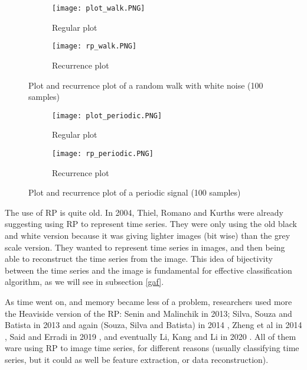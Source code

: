 \documentclass[11pt]{article}
\begin{document}
\begin{onehalfspace}
\begin{figure}[h!]
    \centering
    \captionsetup{justification=centering}
    \begin{subfigure}{0.4\textwidth}
        \texttt{[image: plot\_walk.PNG]}
        \caption{Regular plot}
    \end{subfigure}
    \begin{subfigure}{0.4\textwidth}
        \texttt{[image: rp\_walk.PNG]}
        \caption{Recurrence plot}
    \end{subfigure}
    \caption{Plot and recurrence plot of a random walk with white noise 
    \label{fig:random_walk}(100 samples)}
\end{figure}

\begin{figure}[h!]
    \centering
    \captionsetup{justification=centering}
    \begin{subfigure}{0.4\textwidth}
        \texttt{[image: plot\_periodic.PNG]}
        \caption{Regular plot}
    \end{subfigure}
    \begin{subfigure}{0.4\textwidth}
        \texttt{[image: rp\_periodic.PNG]}
        \caption{Recurrence plot}
    \end{subfigure}
    \caption{Plot and recurrence plot of a periodic signal (100 samples)}
    \label{fig:periodic}
\end{figure}


The use of RP is quite old. In 2004, Thiel, Romano and Kurths \cite{thiel} were already suggesting using RP to represent time series. They were only using the old black and white version because it was giving lighter images (bit wise) than the grey scale version. They wanted to represent time series in images, and then being able to reconstruct the time series from the image. This idea of bijectivity between the time series and the image is fundamental for effective classification algorithm, as we will see in subsection \ref{gaf}. 

As time went on, and memory became less of a problem, researchers used more the Heaviside version of the RP: Senin and Malinchik in 2013; Silva, Souza and Batista in 2013 \cite{silva} and again (Souza, Silva and Batista) in 2014 \cite{souza}, Zheng et al in 2014 \cite{zheng}, Said and Erradi in 2019 \cite{senin}, and eventually Li, Kang and Li in 2020 \cite{li}. All of them ware using RP to image time series, for different reasons (usually classifying time series, but it could as well be feature extraction, or data reconstruction).


\end{onehalfspace}
\end{document}
